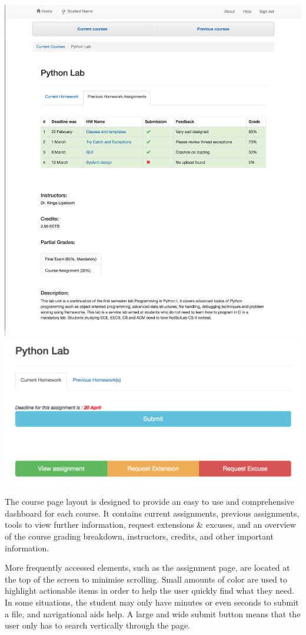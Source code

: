 \includegraphics[width=.75\textwidth]{screenshots/PythonOverview.png}\newpage
\includegraphics[width=\textwidth]{screenshots/OtherPythonOverview.png}\newline

The course page layout is designed to provide an easy to use and comprehensive dashboard for each course. It contains current assignments, previous assignments, tools to view further information, request extensions \& excuses, and an overview of the course grading breakdown, instructors, credits, and other important information.

More frequently accessed elements, such as the assignment page, are located at the top of the screen to minimise scrolling. Small amounts of color are used to highlight actionable items in order to help the user quickly find what they need. In some situations, the student may only have minutes or even seconds to submit a file, and navigational aids help. A large and wide submit button means that the user only has to search vertically through the page.
